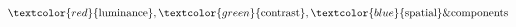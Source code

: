 \documentclass[preview]{standalone}
\begin{document}
\begin{align*}
\textcolor{red}{\text{luminance}}, \textcolor{green}{\text{contrast}}, \textcolor{blue}{\text{spatial}} \text{\&} \text{components}
\end{align*}
\end{document}
